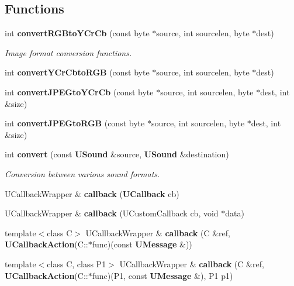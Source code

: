 \subsection*{Functions}
\begin{CompactItemize}
\item 
int {\bf convert\-RGBto\-YCr\-Cb} (const byte $\ast$source, int sourcelen, byte $\ast$dest)\label{uabstractclient_8h_a35}

\begin{CompactList}\small\item\em Image format conversion functions. \item\end{CompactList}\item 
int {\bf convert\-YCr\-Cbto\-RGB} (const byte $\ast$source, int sourcelen, byte $\ast$dest)\label{uabstractclient_8h_a36}

\item 
int {\bf convert\-JPEGto\-YCr\-Cb} (const byte $\ast$source, int sourcelen, byte $\ast$dest, int \&size)\label{uabstractclient_8h_a37}

\item 
int {\bf convert\-JPEGto\-RGB} (const byte $\ast$source, int sourcelen, byte $\ast$dest, int \&size)\label{uabstractclient_8h_a38}

\item 
int {\bf convert} (const {\bf USound} \&source, {\bf USound} \&destination)
\begin{CompactList}\small\item\em Conversion between various sound formats. \item\end{CompactList}\item 
UCallback\-Wrapper \& {\bf callback} ({\bf UCallback} cb)\label{uabstractclient_8h_a40}

\item 
UCallback\-Wrapper \& {\bf callback} (UCustom\-Callback cb, void $\ast$data)\label{uabstractclient_8h_a41}

\item 
template$<$class C$>$ UCallback\-Wrapper \& {\bf callback} (C \&ref, {\bf UCallback\-Action}(C::$\ast$func)(const {\bf UMessage} \&))\label{uabstractclient_8h_a42}

\item 
template$<$class C, class P1$>$ UCallback\-Wrapper \& {\bf callback} (C \&ref, {\bf UCallback\-Action}(C::$\ast$func)(P1, const {\bf UMessage} \&), P1 p1)\label{uabstractclient_8h_a43}


\end{CompactItemize}
